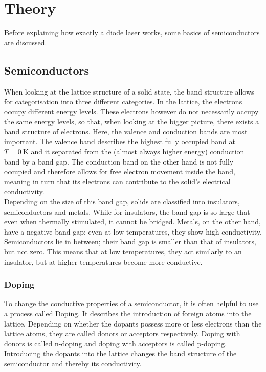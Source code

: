 \section{Theory}
\label{sec:theorie}

Before explaining how exactly a diode laser works, some basics of semiconductors are discussed.

\subsection{Semiconductors}

When looking at the lattice structure of a solid state, the band structure allows for categorisation into three different categories.
In the lattice, the electrons occupy different energy levels. These electrons however do not necessarily occupy the same energy levels, so that,
when looking at the bigger picture, there exists a band structure of electrons.
Here, the valence and conduction bands are most important.
The valence band describes the highest fully occupied band at $T = \SI{0}{\kelvin}$ and it separated from the (almost always higher energy) conduction band
by a band gap.
The conduction band on the other hand is not fully occupied and therefore allows for free electron movement inside the band, meaning in turn that its electrons
can contribute to the solid's electrical conductivity.\\

Depending on the size of this band gap, solids are classified into insulators, semiconductors and metals.
While for insulators, the band gap is so large that even when thermally stimulated, it cannot be bridged.
Metals, on the other hand, have a negative band gap; even at low temperatures, they show high conductivity.
Semiconductors lie in between; their band gap is smaller than that of insulators, but not zero.
This means that at low temperatures, they act similarly to an insulator, but at higher temperatures become more conductive.

\subsubsection{Doping}

To change the conductive properties of a semiconductor, it is often helpful to use a process called Doping.
It describes the introduction of foreign atoms into the lattice.
Depending on whether the dopants possess more or less electrons than the lattice atoms, they are called donors or acceptors respectively.
Doping with donors is called n-doping and doping with acceptors is called p-doping.
Introducing the dopants into the lattice changes the band structure of the semiconductor and thereby its conductivity. \\

